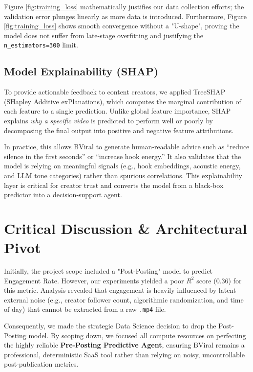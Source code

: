 Figure \ref{fig:training_loss} mathematically justifies our data collection efforts; the validation error plunges linearly as more data is introduced. Furthermore, Figure \ref{fig:training_loss} shows smooth convergence without a "U-shape", proving the model does not suffer from late-stage overfitting and justifying the \texttt{n\_estimators=300} limit.
\subsection{Model Explainability (SHAP)}
To provide actionable feedback to content creators, we applied TreeSHAP (SHapley Additive exPlanations), which computes the marginal contribution of each feature to a single prediction. Unlike global feature importance, SHAP explains \emph{why a specific video} is predicted to perform well or poorly by decomposing the final output into positive and negative feature attributions.

In practice, this allows BViral to generate human‑readable advice such as “reduce silence in the first seconds” or “increase hook energy.” It also validates that the model is relying on meaningful signals (e.g., hook embeddings, acoustic energy, and LLM tone categories) rather than spurious correlations. This explainability layer is critical for creator trust and converts the model from a black‑box predictor into a decision‑support agent.

\section{Critical Discussion \& Architectural Pivot}
Initially, the project scope included a "Post-Posting" model to predict Engagement Rate. However, our experiments yielded a poor $R^2$ score (0.36) for this metric. Analysis revealed that engagement is heavily influenced by latent external noise (e.g., creator follower count, algorithmic randomization, and time of day) that cannot be extracted from a raw \texttt{.mp4} file. 

Consequently, we made the strategic Data Science decision to drop the Post-Posting model. By scoping down, we focused all compute resources on perfecting the highly reliable \textbf{Pre-Posting Predictive Agent}, ensuring BViral remains a professional, deterministic SaaS tool rather than relying on noisy, uncontrollable post-publication metrics.

